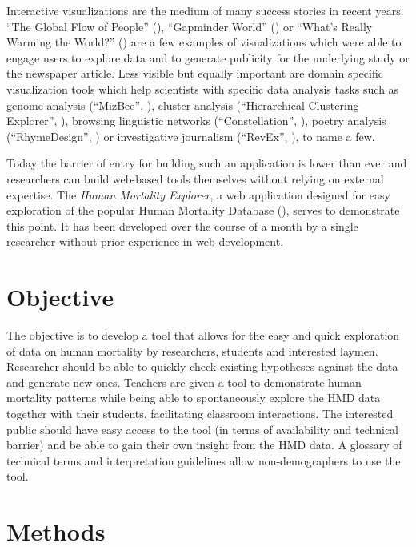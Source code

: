 \documentclass[
  12pt
]{scrartcl}
\begin{document}
Interactive visualizations are the medium of many success stories in recent years. \enquote{The Global Flow of People} (\cite{Sander2014}), \enquote{Gapminder World} (\cite{Rosling2006}) or \enquote{What's Really Warming the World?} (\cite{Roston2015}) are a few examples of visualizations which were able to engage users to explore data and to generate publicity for the underlying study or the newspaper article. Less visible but equally important are domain specific visualization tools which help scientists with specific data analysis tasks such as genome analysis (\enquote{MizBee}, \cite{Meyer2009}), cluster analysis (\enquote{Hierarchical Clustering Explorer}, \cite{Seo2002}), browsing linguistic networks (\enquote{Constellation}, \cite{Munzner1999}), poetry analysis (\enquote{RhymeDesign}, \cite{McCurdy2015}) or investigative journalism (\enquote{RevEx}, \cite{Bertini2015}), to name a few.

Today the barrier of entry for building such an application is lower than ever and researchers can build web-based tools themselves without relying on external expertise. The \emph{Human Mortality Explorer}, a web application designed for easy exploration of the popular Human Mortality Database (\cite{Hmd2015}), serves to demonstrate this point. It has been developed over the course of a month by a single researcher without prior experience in web development.

\section*{Objective}

The objective is to develop a tool that allows for the easy and quick exploration of data on human mortality by researchers, students and interested laymen. Researcher should be able to quickly check existing hypotheses against the data and generate new ones. Teachers are given a tool to demonstrate human mortality patterns while being able to spontaneously explore the HMD data together with their students, facilitating classroom interactions. The interested public should have easy access to the tool (in terms of availability and technical barrier) and be able to gain their own insight from the HMD data. A glossary of technical terms and interpretation guidelines allow non-demographers to use the tool.

\section*{Methods}
\end{document}
